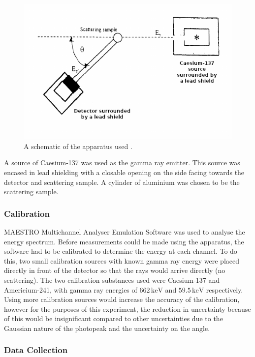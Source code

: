 \documentclass[%
reprint,
amsmath,amssymb,
aps,
floatfix
]{revtex4-2}
\begin{document}
			\begin{figure}
				\includegraphics[width=0.85\columnwidth]{apparatus1.png}
				\caption{\label{fig:apparatus1}A schematic of the apparatus used \cite{manual1}.}
			\end{figure}					
			
			A source of Caesium-137 was used as the gamma ray emitter. This source was encased in lead shielding with a closable opening on the side facing towards the detector and scattering sample. A cylinder of aluminium was chosen to be the scattering sample.
			
			\subsubsection{Calibration}			
			
			MAESTRO Multichannel Analyser Emulation Software was used to analyse the energy spectrum. Before measurements could be made using the apparatus, the software had to be calibrated to determine the energy at each channel. To do this, two small calibration sources with known gamma ray energy were placed directly in front of the detector so that the rays would arrive directly (no scattering). The two calibration substances used were Caesium-137 and Americium-241, with gamma ray energies of $662 \,\text{keV}$ and $59.5 \,\text{keV}$ respectively. Using more calibration sources would increase the accuracy of the calibration, however for the purposes of this experiment, the reduction in uncertainty because of this would be insignificant compared to other uncertainties due to the Gaussian nature of the photopeak and the uncertainty on the angle.\\
			
			\subsubsection{Data Collection}			
			
\end{document}
